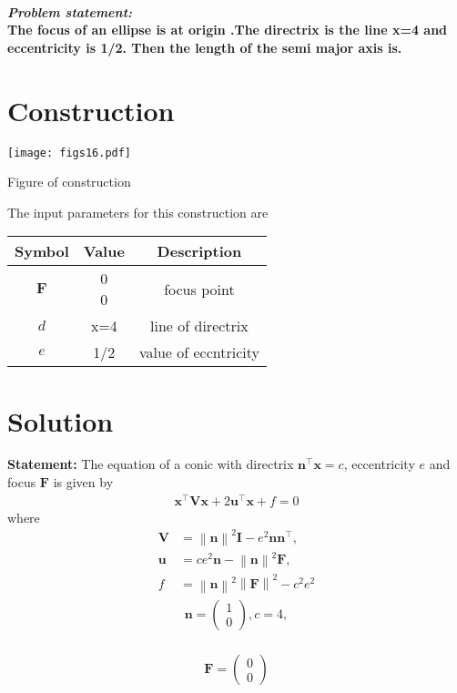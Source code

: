 \documentclass[10pt, a4paper]{article}
\title{\mytitle}
\author{\myauthor\hspace{1em}\\\contact\\FWC22076\hspace{6.5em}IITH\hspace{0.5em}\mymodule\hspace{6em}September}
\date{}
\providecommand{\norm}[1]{\left\lVert#1\right\rVert}
\newcommand{\myvec}[1]{\ensuremath{\begin{pmatrix}#1\end{pmatrix}}}
\let\vec\mathbf
\begin{document}
\maketitle
\paragraph{\textit{\large Problem statement: }\\The focus of an ellipse is at origin .The directrix is the line x=4 and eccentricity is 1/2. Then the length of the semi major axis is. \\}
 \section*{Construction}
 	\begin{center}
  \texttt{[image: figs16.pdf]}
  
  Figure of construction
  	\end{center}
The input parameters for this construction are 
\begin{center}
\begin{tabular}{|c|c|c|}
	\hline
	\textbf{Symbol}&\textbf{Value}&\textbf{Description}\\
	\hline
	$\vec{F}$&\myvec{0\\0}&focus point\\[8pt]
	\hline
		${d}$&x=4&line of directrix\\[8pt]
	\hline
		$e$&{1/2}&value of eccntricity\\[8pt]
	\hline

\end{tabular}
\end{center}
\section*{Solution}
\textbf{Statement:}
The equation of  a conic with directrix $\vec{n}^{\top}\vec{x} = c$, eccentricity $e$ and focus $\vec{F}$ is given by 
\begin{align}
    \label{eq:conic_quad_form}
    \vec{x}^{\top}\vec{V}\vec{x}+2\vec{u}^{\top}\vec{x}+f=0
    \end{align}
where     
\begin{align}
  \label{eq:conic_quad_form_v}
\vec{V} &=\norm{\vec{n}}^2\vec{I}-e^2\vec{n}\vec{n}^{\top}, 
\\
\label{eq:conic_quad_form_u}
\vec{u} &= ce^2\vec{n}-\norm{\vec{n}}^2\vec{F}, 
\\
\label{eq:conic_quad_form_f}
f &= \norm{\vec{n}}^2\norm{\vec{F}}^2-c^2e^2
    \end{align}
  \begin{align}
		        \vec{n} = \myvec{1 \\ 0}, c = 4,
		  \end{align}      
		        \\
		     \begin{align}
		         \vec{F} = \myvec{0 \\ 0}
		     \end{align}    
		   
\end{document}
